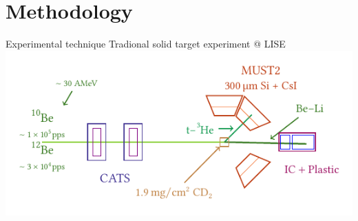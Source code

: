 \documentclass[aspectratio=43, dvipsnames]{beamer}
\begin{document}
\section{Methodology}
\begin{frame}[c]{Experimental technique}
    Tradional solid target experiment @ LISE
    \vspace{1.5em}
    \includegraphics[width=1\linewidth]{figures/setup.pdf}
\end{frame}
\end{document}
